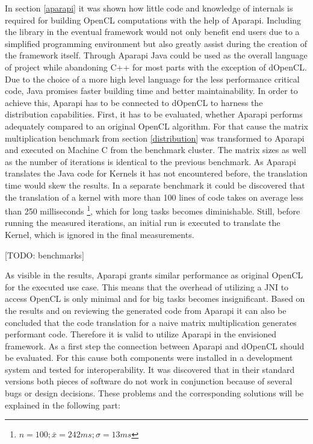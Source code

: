 In section \ref{aparapi} it was shown how little code and knowledge of internals is required for building OpenCL computations with the help of Aparapi. Including the library in the eventual framework would not only benefit end users due to a simplified programming environment but also greatly assist during the creation of the framework itself. Through Aparapi Java could be used as the overall language of project while abandoning C++ for most parts with the exception of dOpenCL. Due to the choice of a more high level language for the less performance critical code, Java promises faster building time and better maintainability. In order to achieve this, Aparapi has to be connected to dOpenCL to harness the distribution capabilities. First, it has to be evaluated, whether Aparapi performs adequately compared to an original OpenCL algorithm. For that cause the matrix multiplication benchmark from section \ref{distribution} was transformed to Aparapi and executed on Machine C from the benchmark cluster. The matrix sizes as well as the number of iterations is identical to the previous benchmark. As Aparapi translates the Java code for Kernels it has not encountered before, the translation time would skew the results. In a separate benchmark it could be discovered that the translation of a kernel with more than 100 lines of code takes on average less than 250 milliseconds \footnote{$n=100; \bar{x} = 242ms; \sigma = 13ms$}, which for long tasks becomes diminishable. Still, before running the measured iterations, an initial run is executed to translate the Kernel, which is ignored in the final measurements. 

[TODO: benchmarks]

As visible in the results, Aparapi grants similar performance as original OpenCL for the executed use case. This means that the overhead of utilizing a JNI to access OpenCL is only minimal and for big tasks becomes insignificant. Based on the results and on reviewing the generated code from Aparapi it can also be concluded that the code translation for a naive matrix multiplication generates performant code. Therefore it is valid to utilize Aparapi in the envisioned framework. As a first step the connection between Aparapi and dOpenCL should be evaluated. For this cause both components were installed in a development system and tested for interoperability. It was discovered that in their standard versions both pieces of software do not work in conjunction because of several bugs or design decisions. These problems and the corresponding solutions will be explained in the following part:


